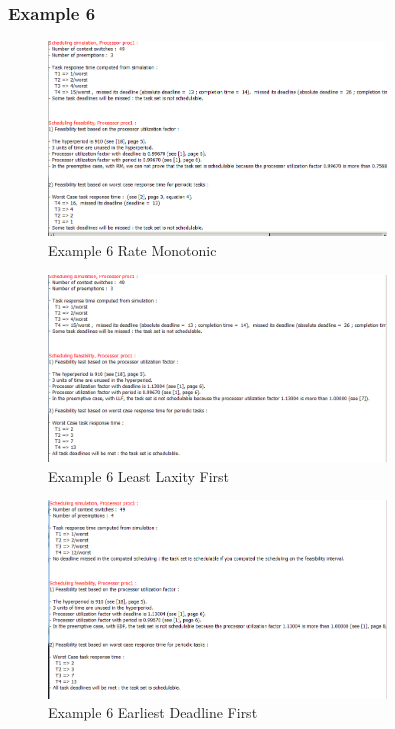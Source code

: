 \documentclass{article}
\begin{document}
\subsubsection*{Example 6}
\begin{figure}[H]
    \centering
    \includegraphics[width=0.8\textwidth]{6_RM.png}
    \caption{Example 6 Rate Monotonic}
\end{figure}
\begin{figure}[H]
    \centering
    \includegraphics[width=0.8\textwidth]{6_LLF.png}
    \caption*{Example 6 Least Laxity First}
\end{figure}
\begin{figure}[H]
    \centering
    \includegraphics[width=0.8\textwidth]{6_EDF.png}
    \caption{Example 6 Earliest Deadline First}
\end{figure}
\end{document}
